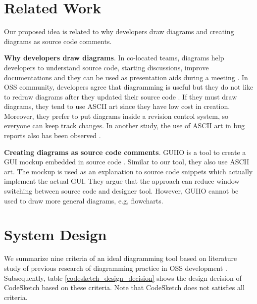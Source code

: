 \documentclass{sig-alternate}
\begin{document}
\section{Related Work}
\label{related_work}

Our proposed idea is related to why developers draw diagrams and creating diagrams as source code comments.

\textbf{Why developers draw diagrams}. In co-located teams, diagrams help developers to understand source code, starting discussions, improve documentations and they can be used as presentation aids during a meeting \cite{Cherubini2007}.  In OSS community, developers agree that diagramming is useful but they do not like to redraw diagrams after they updated their source code  \cite{Yatani2009, Eunyoung2010}. If they must draw diagrams, they tend to use ASCII art since they have low cost in creation. Moreover, they prefer to put diagrams inside a revision control system, so everyone can keep track changes. In another study, the use of ASCII art in bug reports also has been observed \cite{Twidale2005}.

\textbf{Creating diagrams as source code comments}. GUIIO is a tool to create a GUI mockup embedded in source code \cite{Simpson2011}. Similar to our tool, they also use ASCII art. The mockup is used as an explanation to source code snippets which actually implement the actual GUI. They argue that the approach can reduce window switching between source code and designer tool. However, GUIIO cannot be used to draw more general diagrams, e.g, flowcharts.

\section{System Design}
\label{system_design}

We summarize nine criteria of an ideal diagramming tool based on literature study of previous research of diagramming practice in OSS development  \cite{Yatani2009, Eunyoung2010}. 
Subsequently, table \ref{codesketch_design_decision} shows the design decision of CodeSketch based on these criteria. Note that CodeSketch does not satisfies all criteria.
\end{document}
